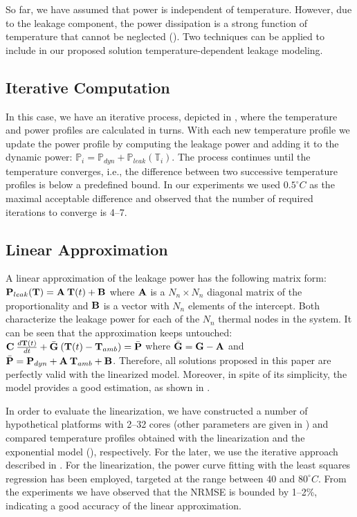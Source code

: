 So far, we have assumed that power is independent of temperature. However, due to the leakage component, the power dissipation is a strong function of temperature that cannot be neglected (). Two techniques can be applied to include in our proposed solution temperature-dependent leakage modeling.

\subsection{Iterative Computation} \label{sec:iterative-leakage}
In this case, we have an iterative process, depicted in , where the temperature and power profiles are calculated in turns. With each new temperature profile we update the power profile by computing the leakage power and adding it to the dynamic power: $\mathbb{P}_i = \mathbb{P}_{dyn} + \mathbb{P}_{leak}(\mathbb{T}_i)$. The process continues until the temperature converges, i.e., the difference between two successive temperature profiles is below a predefined bound. In our experiments we used $0.5^\circ C$ as the maximal acceptable difference and observed that the number of required iterations to converge is 4--7.




\subsection{Linear Approximation} \label{sec:linearized-leakage}
A linear approximation of the leakage power has the following matrix form: $\mathbf{P}_{leak}(\mathbf{T}) = \mathbf{A} \: \mathbf{T}(t) + \mathbf{B}$ where $\mathbf{A}$ is a $N_n \times N_n$ diagonal matrix of the proportionality and $\mathbf{B}$ is a vector with $N_n$ elements of the intercept. Both characterize the leakage power for each of the $N_n$ thermal nodes in the system. It can be seen that the approximation keeps  untouched: $\mathbf{C} \: \frac{d\mathbf{T}(t)}{dt} + \bar{\mathbf{G}} \: (\mathbf{T}(t) - \mathbf{T}_{amb}) = \bar{\mathbf{P}}$ where $\bar{\mathbf{G}} = \mathbf{G} - \mathbf{A}$ and $\bar{\mathbf{P}} = \mathbf{P}_{dyn} + \mathbf{A} \: \mathbf{T}_{amb} + \mathbf{B}$. Therefore, all solutions proposed in this paper are perfectly valid with the linearized model. Moreover, in spite of its simplicity, the model provides a good estimation, as shown in \cite{liu2007}.

In order to evaluate the linearization, we have constructed a number of hypothetical platforms with 2--32 cores (other parameters are given in ) and compared temperature profiles obtained with the linearization and the exponential model (), respectively. For the later, we use the iterative approach described in . For the linearization, the power curve fitting with the least squares regression \cite{press2007} has been employed, targeted at the range between 40 and $80^\circ C$. From the experiments we have observed that the NRMSE is bounded by 1--2\%, indicating a good accuracy of the linear approximation.
